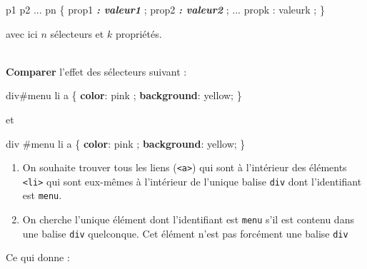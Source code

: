 \documentclass[a4paper,17pt]{extarticle}
\newenvironment{eleve}%
{\begin{activite}\color{noiramu}\\}
{\end{activite}}
\providecommand{\tightlist}{%
      \setlength{\itemsep}{0pt}\setlength{\parskip}{0pt}}
\newenvironment{Shaded}{}{}
\newcommand{\KeywordTok}[1]{\textcolor[rgb]{0.00,0.44,0.13}{\textbf{{#1}}}}
\newcommand{\FunctionTok}[1]{\textcolor[rgb]{0.02,0.16,0.49}{{#1}}}
\newcommand{\NormalTok}[1]{{#1}}
\newcommand{\ConstantTok}[1]{\textcolor[rgb]{0.53,0.00,0.00}{{#1}}}
\newcommand{\OperatorTok}[1]{\textcolor[rgb]{0.40,0.40,0.40}{{#1}}}
\newcommand{\PreprocessorTok}[1]{\textcolor[rgb]{0.74,0.48,0.00}{{#1}}}
\newcommand{\InformationTok}[1]{\textcolor[rgb]{0.38,0.63,0.69}{\textbf{\textit{{#1}}}}}
\begin{document}
\begin{Shaded}
\begin{Highlighting}[]
\NormalTok{p1 p2 }\FunctionTok{...}\NormalTok{ pn \{ prop1 }\InformationTok{: valeur1}\NormalTok{ ;}
\NormalTok{    prop2 }\InformationTok{: valeur2}\NormalTok{ ;}
    \FunctionTok{...}
\NormalTok{    propk : valeurk }\OperatorTok{;}\NormalTok{ \}}
\end{Highlighting}
\end{Shaded}

avec ici \(n\) sélecteurs et \(k\) propriétés.
\begin{eleve}
    \textbf{Comparer} l'effet des sélecteurs suivant :

\begin{Shaded}
\begin{Highlighting}[]
\NormalTok{div}\PreprocessorTok{\#menu}\NormalTok{ li a \{ }\KeywordTok{color}\NormalTok{: }\ConstantTok{pink} \OperatorTok{;} \KeywordTok{background}\NormalTok{: }\ConstantTok{yellow}\OperatorTok{;}\NormalTok{ \}}
\end{Highlighting}
\end{Shaded}

et

\begin{Shaded}
\begin{Highlighting}[]
\NormalTok{div }\PreprocessorTok{\#menu}\NormalTok{ li a \{ }\KeywordTok{color}\NormalTok{: }\ConstantTok{pink} \OperatorTok{;} \KeywordTok{background}\NormalTok{: }\ConstantTok{yellow}\OperatorTok{;}\NormalTok{ \}}
\end{Highlighting}
\end{Shaded}
        
        \end{eleve}\begin{reponse}
    \begin{enumerate}
\def\labelenumi{\arabic{enumi}.}
\tightlist
\item
  On souhaite trouver tous les liens
  (\texttt{\textless{}a\textgreater{}}) qui sont à l'intérieur des
  éléments \texttt{\textless{}li\textgreater{}} qui sont eux-mêmes à
  l'intérieur de l'unique balise \texttt{div} dont l'identifiant est
  \texttt{menu}.
\item
  On cherche l'unique élément dont l'identifiant est \texttt{menu} s'il
  est contenu dans une balise \texttt{div} quelconque. Cet élément n'est
  pas forcément une balise \texttt{div}
\end{enumerate}

Ce qui donne :


\end{reponse}
\end{document}
